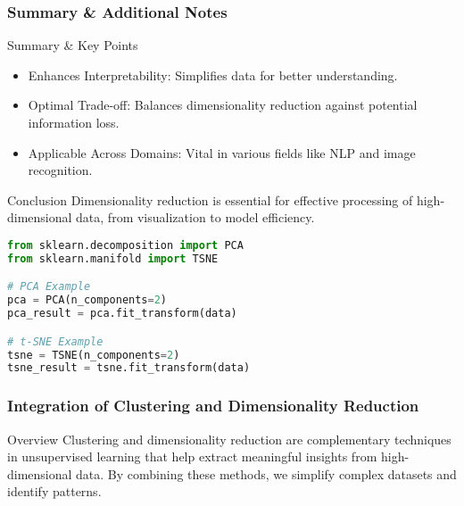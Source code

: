 \documentclass[aspectratio=169]{beamer}
\begin{document}
\begin{frame}[fragile]
    \frametitle{Summary & Additional Notes}
    \begin{block}{Summary & Key Points}
        \begin{itemize}
            \item Enhances Interpretability: Simplifies data for better understanding.
            \item Optimal Trade-off: Balances dimensionality reduction against potential information loss.
            \item Applicable Across Domains: Vital in various fields like NLP and image recognition.
        \end{itemize}
    \end{block}
    
    \begin{block}{Conclusion}
        Dimensionality reduction is essential for effective processing of high-dimensional data, from visualization to model efficiency.
    \end{block}

    \begin{lstlisting}[language=Python]
from sklearn.decomposition import PCA
from sklearn.manifold import TSNE

# PCA Example
pca = PCA(n_components=2)
pca_result = pca.fit_transform(data)

# t-SNE Example
tsne = TSNE(n_components=2)
tsne_result = tsne.fit_transform(data)
    \end{lstlisting}
\end{frame}

\begin{frame}[fragile]
    \frametitle{Integration of Clustering and Dimensionality Reduction}
    \begin{block}{Overview}
        Clustering and dimensionality reduction are complementary techniques in unsupervised learning that help extract meaningful insights from high-dimensional data. By combining these methods, we simplify complex datasets and identify patterns.
    \end{block}
\end{frame}
\end{document}
